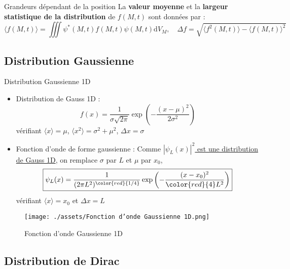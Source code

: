 \begin{Prop}{Grandeurs dépendant de la position}{}
La \textbf{valeur moyenne} et la \textbf{largeur statistique de la distribution} de $f(M,t)$ sont données par :
\[
  \boxed{\langle f(M,t) \rangle = \iiint \psi ^*(M,t) f(M,t) \psi(M,t) \mathrm{d}V_M, \quad \Delta f = \sqrt{ \langle f ^2(M,t) \rangle - \langle f(M,t) \rangle ^2}} 
\]

\end{Prop}


\subsection{Distribution Gaussienne} %
\label{sub:Distribution Gaussienne}

\begin{Example}{Distribution Gaussienne 1D}{}
\begin{itemize}
    \item Distribution de Gauss 1D : \[
        \boxed{   f(x) = \frac{1}{\sigma \sqrt{2\pi}} \exp \left(-\frac{(x-\mu)^2}{2 \sigma ^2}\right)} 
    \]
    vérifiant $\langle x \rangle = \mu$, $\langle x ^2 \rangle = \sigma ^2 + \mu ^2$, $\Delta x = \sigma$
  \item Fonction d'onde de forme gaussienne : Comme \underline{$|\psi_L(x)|^2$ est une distribution de Gauss 1D}, on remplace $\sigma$ par $L$ et $\mu$ par $x_0$, \[
    \boxed{\psi_L(x) = \frac{1}{(2 \pi L ^2)^{\color{red}{1 / 4}}} \exp\left( - \frac{(x-x_0) ^2}{{\color{red}{4}} L ^2}\right)}  
  \]
  vérifiant $\langle x \rangle = x_0$ et $\Delta x = L$
\end{itemize}

\begin{figure}[H] %
  \centering
  \texttt{[image: ./assets/Fonction d'onde Gaussienne 1D.png]}
  \caption{Fonction d'onde Gaussienne 1D}
  \label{fig:Fonction d'onde Gaussienne 1D}
\end{figure}


\end{Example}

\subsection{Distribution de Dirac} %
\label{sub:Distribution de Dirac}


